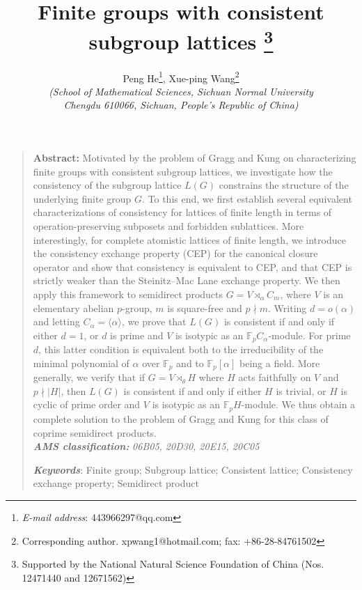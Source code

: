 \documentclass[12pt]{article}
\begin{document}
\setcounter{page}{1}

\title{{\textbf{Finite groups with consistent subgroup lattices}}
\thanks {Supported by the National Natural Science Foundation of China (Nos. 12471440 and 12671562)}
}
\author{Peng He\footnote{\emph{E-mail address}: 443966297@qq.com}, Xue-ping Wang\footnote{Corresponding author. xpwang1@hotmail.com; fax: +86-28-84761502}\\
\emph{\small (School of Mathematical Sciences, Sichuan Normal University}\\ \emph{\small Chengdu 610066, Sichuan, People's Republic of China)}}
\newcommand{\pp}[2]{\frac{\partial #1}{\partial #2}}
\date{}
\maketitle
\begin{quote}
{\bf Abstract:} {Motivated by the problem of Gragg and Kung on characterizing finite groups with consistent subgroup lattices, we investigate 
how the consistency of the subgroup lattice $L(G)$ constrains the structure of the underlying finite group $G$. To this end, we first establish 
several equivalent characterizations of consistency for lattices of finite length in terms of operation-preserving subposets and forbidden sublattices. 
More interestingly, for complete atomistic lattices of finite length, we introduce the consistency exchange property (CEP) for the canonical closure operator and show that 
consistency is equivalent to CEP, and that CEP is strictly weaker than the Steinitz–Mac Lane exchange property. We then apply this framework 
to semidirect products $G=V\rtimes_{\alpha} C_m$, where $V$ is an elementary abelian $p$-group, $m$ is square-free and $p\nmid m$. Writing $d=o(\alpha)$ and
letting $C_\alpha=\langle\alpha\rangle$, we prove that $L(G)$ is consistent if
and only if either $d=1$, or $d$ is prime and $V$ is isotypic as an
$\mathbb F_pC_\alpha$-module. For prime $d$, this latter condition is
equivalent both to the irreducibility of the minimal polynomial of $\alpha$
over $\mathbb F_p$ and to $\mathbb F_p[\alpha]$ being a field.
More generally, we verify that if $G=V\rtimes_\theta H$ where $H$ acts faithfully on $V$ and $p\nmid |H|$, then $L(G)$ is consistent if and only if either $H$ is trivial, or $H$ is cyclic of prime order and $V$ is isotypic as an $\mathbb F_pH$-module. We thus obtain a complete solution to the problem of Gragg and Kung for this class of coprime semidirect products.}
\quad \\
\textbf{\emph{AMS classification:}} \emph{06B05, 20D30, 20E15, 20C05}

{\textbf{\emph{Keywords}}:} Finite group; Subgroup lattice; Consistent lattice;  Consistency exchange property; 
Semidirect product
\end{quote}
\end{document}
